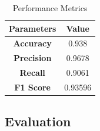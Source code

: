     \begin{table}[h]
        \centering
        \renewcommand{\arraystretch}{1.5} %
        \begin{tabular}{|c|c|}
        \hline
        \textbf{Parameters}                     & \textbf{Value}      \\
        \hline
        \textbf{Accuracy}                        & 0.938                 \\
        \hline
        \textbf{Precision}                       & 0.9678                \\
        \hline
        \textbf{Recall}                        & 0.9061             \\
        \hline
        \textbf{F1 Score}                       & 0.93596                \\
        \hline
        \end{tabular}
        \caption{Performance Metrics}
        \label{tab:metrics}
    \end{table}

    


    
\newpage
\subsection{Evaluation}
